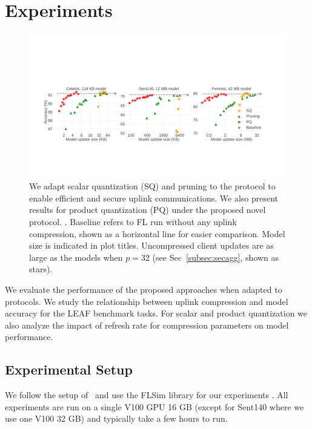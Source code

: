 \section{Experiments}
\label{sec:experiments}

\begin{figure}[t]
    \centering
    \includegraphics[width=\textwidth]{submissions/GrahamCormode/figs/results_summary.pdf}
    \vspace{-5mm}
    \caption{\label{fig:results_summary}
    We adapt scalar quantization (SQ) and pruning to the \SecAgg protocol to enable efficient and secure uplink communications. We also present results for product quantization (PQ) under the proposed novel \SecInd protocol. . Baseline refers to \SecAgg FL run without any uplink compression, shown as a horizontal line for easier comparison. Model size is indicated in plot titles. Uncompressed client updates are as large as the models when $p=32$ (see Sec~\ref{subsec:secagg}, shown as stars).
    }
\end{figure}

We evaluate the performance of the proposed approaches when adapted to \SecAgg protocols.
We study the relationship between uplink compression and model accuracy for the LEAF benchmark tasks.
For scalar and product quantization we also analyze the impact of refresh rate for compression parameters on  model performance.

\subsection{Experimental Setup}
\label{subsec:setup}
We follow the setup of~\cite{nguyen2021federated} and use the {FLSim library}
for our experiments
.
All experiments are run on a single V100 GPU 16 GB (except for Sent140 where we use one V100 32 GB) and typically take a few hours to run.

